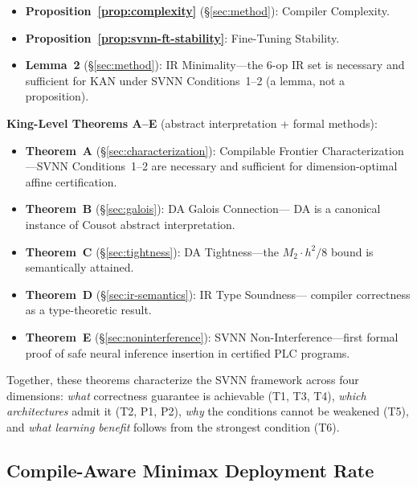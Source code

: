 \begin{remark}
\begin{itemize}
          FuseMatMulAdd, LUTizeEXP.
    \item \textbf{Proposition~\ref{prop:complexity}} ({\S}\ref{sec:method}):
          Compiler Complexity.
    \item \textbf{Proposition~\ref{prop:svnn-ft-stability}}:
          Fine-Tuning Stability.
    \item \textbf{Lemma~2} ({\S}\ref{sec:method}): IR Minimality---the
          6-op IR set is necessary and sufficient for KAN under SVNN
          Conditions~1--2 (a lemma, not a proposition).
\end{itemize}
\vspace{4pt}
\noindent\textbf{King-Level Theorems A--E} (abstract interpretation + formal methods):
\begin{itemize}
    \item \textbf{Theorem~A} ({\S}\ref{sec:characterization}): Compilable
          Frontier Characterization---SVNN Conditions~1--2 are necessary
          and sufficient for dimension-optimal affine certification.
    \item \textbf{Theorem~B} ({\S}\ref{sec:galois}): DA Galois Connection---
          DA is a canonical instance of Cousot abstract interpretation.
    \item \textbf{Theorem~C} ({\S}\ref{sec:tightness}): DA Tightness---the
          $M_2 \cdot h^2 / 8$ bound is semantically attained.
    \item \textbf{Theorem~D} ({\S}\ref{sec:ir-semantics}): IR Type Soundness---
          compiler correctness as a type-theoretic result.
    \item \textbf{Theorem~E} ({\S}\ref{sec:noninterference}): SVNN
          Non-Interference---first formal proof of safe neural inference
          insertion in certified PLC programs.
\end{itemize}
Together, these theorems characterize the SVNN framework across four
dimensions: \textit{what} correctness guarantee is achievable (T1, T3, T4),
\textit{which architectures} admit it (T2, P1, P2), \textit{why} the
conditions cannot be weakened (T5), and \textit{what learning benefit}
follows from the strongest condition (T6).
\end{remark}

\vspace{4pt}
\subsection{Compile-Aware Minimax Deployment Rate}
\label{sec:compile-aware-minimax}

